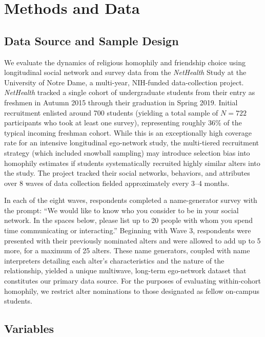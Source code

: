 \documentclass[11pt]{article}
\begin{document}
\section{Methods and Data}

\subsection{Data Source and Sample Design}
We evaluate the dynamics of religious homophily and friendship choice using longitudinal social network and survey data from the \textit{NetHealth} Study at the University of Notre Dame, a multi-year, NIH-funded data-collection project. \textit{NetHealth} tracked a single cohort of undergraduate students from their entry as freshmen in Autumn 2015 through their graduation in Spring 2019. Initial recruitment enlisted around 700 students (yielding a total sample of $N = 722$ participants who took at least one survey), representing roughly $36\%$ of the typical incoming freshman cohort. While this is an exceptionally high coverage rate for an intensive longitudinal ego-network study, the multi-tiered recruitment strategy (which included snowball sampling) may introduce selection bias into homophily estimates if students systematically recruited highly similar alters into the study. The project tracked their social networks, behaviors, and attributes over 8 waves of data collection fielded approximately every 3--4 months. 

In each of the eight waves, respondents completed a name-generator survey with the prompt: ``We would like to know who you consider to be in your social network. In the spaces below, please list up to 20 people with whom you spend time communicating or interacting.'' Beginning with Wave 3, respondents were presented with their previously nominated alters and were allowed to add up to 5 more, for a maximum of 25 alters. These name generators, coupled with name interpreters detailing each alter's characteristics and the nature of the relationship, yielded a unique multiwave, long-term ego-network dataset that constitutes our primary data source. For the purposes of evaluating within-cohort homophily, we restrict alter nominations to those designated as fellow on-campus students.

\subsection{Variables}
\end{document}
